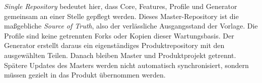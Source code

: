 \begin{beginnerstatement}

\emph{Single Repository} bedeutet hier, dass Core, Features, Profile und
Generator gemeinsam an einer Stelle gepflegt werden. Dieses
Master-Repository ist die maßgebliche \emph{Source of Truth}, also der
verlässliche Ausgangsstand der Vorlage. Die Profile sind keine getrennten
Forks oder Kopien dieser Wartungsbasis. Der Generator erstellt daraus ein
eigenständiges Produktrepository mit den ausgewählten Teilen. Danach bleiben
Master und Produktprojekt getrennt. Spätere Updates des Masters werden nicht
automatisch synchronisiert, sondern müssen gezielt in das Produkt übernommen
werden.

\end{beginnerstatement}
